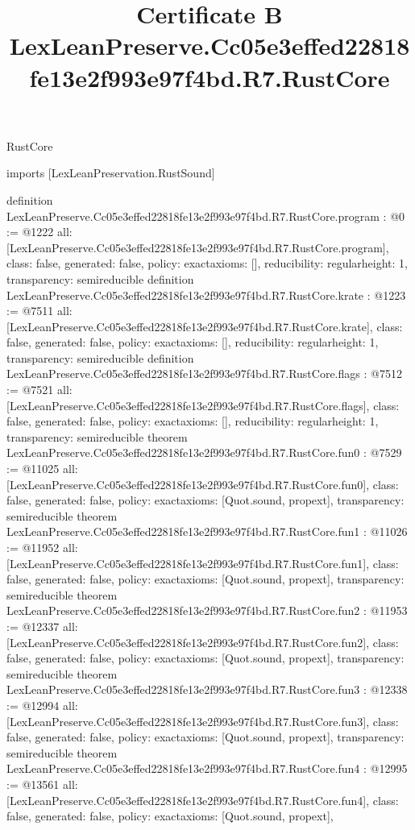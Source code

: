 \begin{lexlean}{RustCore}
\title{Certificate B LexLeanPreserve.Cc05e3effed22818fe13e2f993e97f4bd.R7.RustCore}
\begin{coremodule}
imports [LexLeanPreservation.RustSound]

definition LexLeanPreserve.Cc05e3effed22818fe13e2f993e97f4bd.R7.RustCore.program : @0 := @1222 {
  all: [LexLeanPreserve.Cc05e3effed22818fe13e2f993e97f4bd.R7.RustCore.program],
  class: false,
  generated: false,
  policy: exact{axioms: []},
  reducibility: regular{height: 1},
  transparency: semireducible
}
definition LexLeanPreserve.Cc05e3effed22818fe13e2f993e97f4bd.R7.RustCore.krate : @1223 := @7511 {
  all: [LexLeanPreserve.Cc05e3effed22818fe13e2f993e97f4bd.R7.RustCore.krate],
  class: false,
  generated: false,
  policy: exact{axioms: []},
  reducibility: regular{height: 1},
  transparency: semireducible
}
definition LexLeanPreserve.Cc05e3effed22818fe13e2f993e97f4bd.R7.RustCore.flags : @7512 := @7521 {
  all: [LexLeanPreserve.Cc05e3effed22818fe13e2f993e97f4bd.R7.RustCore.flags],
  class: false,
  generated: false,
  policy: exact{axioms: []},
  reducibility: regular{height: 1},
  transparency: semireducible
}
theorem LexLeanPreserve.Cc05e3effed22818fe13e2f993e97f4bd.R7.RustCore.fun0 : @7529 := @11025 {
  all: [LexLeanPreserve.Cc05e3effed22818fe13e2f993e97f4bd.R7.RustCore.fun0],
  class: false,
  generated: false,
  policy: exact{axioms: [Quot.sound, propext]},
  transparency: semireducible
}
theorem LexLeanPreserve.Cc05e3effed22818fe13e2f993e97f4bd.R7.RustCore.fun1 : @11026 := @11952 {
  all: [LexLeanPreserve.Cc05e3effed22818fe13e2f993e97f4bd.R7.RustCore.fun1],
  class: false,
  generated: false,
  policy: exact{axioms: [Quot.sound, propext]},
  transparency: semireducible
}
theorem LexLeanPreserve.Cc05e3effed22818fe13e2f993e97f4bd.R7.RustCore.fun2 : @11953 := @12337 {
  all: [LexLeanPreserve.Cc05e3effed22818fe13e2f993e97f4bd.R7.RustCore.fun2],
  class: false,
  generated: false,
  policy: exact{axioms: [Quot.sound, propext]},
  transparency: semireducible
}
theorem LexLeanPreserve.Cc05e3effed22818fe13e2f993e97f4bd.R7.RustCore.fun3 : @12338 := @12994 {
  all: [LexLeanPreserve.Cc05e3effed22818fe13e2f993e97f4bd.R7.RustCore.fun3],
  class: false,
  generated: false,
  policy: exact{axioms: [Quot.sound, propext]},
  transparency: semireducible
}
theorem LexLeanPreserve.Cc05e3effed22818fe13e2f993e97f4bd.R7.RustCore.fun4 : @12995 := @13561 {
  all: [LexLeanPreserve.Cc05e3effed22818fe13e2f993e97f4bd.R7.RustCore.fun4],
  class: false,
  generated: false,
  policy: exact{axioms: [Quot.sound, propext]},
}
\end{coremodule}
\end{lexlean}
